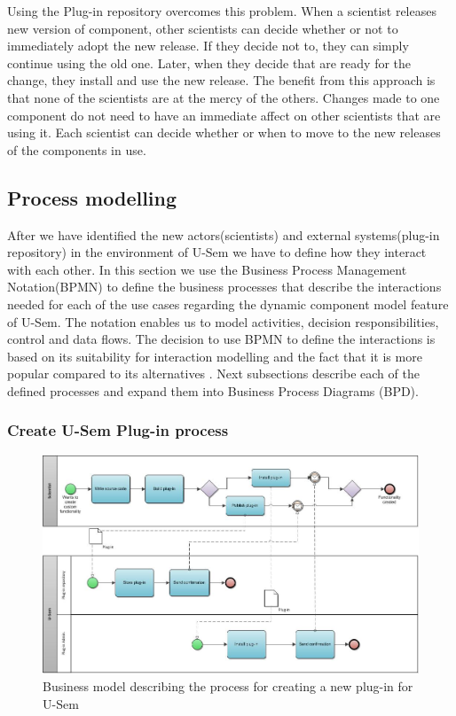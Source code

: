 Using the Plug-in repository overcomes this problem. When a scientist releases new version of component, other scientists can decide whether or not to immediately adopt the new release. If they decide not to, they can simply continue using the old one. 
Later, when they decide that are ready for the change, they install and use the new release. The benefit from this approach is that none of the scientists are at the mercy of the others. Changes made to one component do not need to have an immediate affect on other scientists that are using it. Each scientist can decide whether or when to move to the new releases of the components in use.


\subsection{Process modelling}

After we have identified the new actors(scientists) and external systems(plug-in repository) in the environment of U-Sem we have to define how they interact with each other. In this section we use the Business Process Management Notation(BPMN) \cite{BPMN} to define the business processes that describe the interactions needed for each of the use cases regarding the dynamic component model feature of U-Sem. The notation enables us to model activities, decision responsibilities, control and data flows. The decision to use BPMN to define the interactions is based on its suitability for interaction modelling and the fact that it is more popular compared to its alternatives \cite{Decker}. Next subsections describe each of the defined processes and expand them into Business Process Diagrams (BPD).

\subsubsection{Create U-Sem Plug-in process}

\begin{figure}[h!]
  \centering
  	\includegraphics[scale=0.7,angle=90]{plug-in/business_processes/CreatePlugInBusinessModel.jpg}
  \caption{Business model describing the process for creating a new plug-in for U-Sem}
  \label{fig_install_bpm}
\end{figure}

